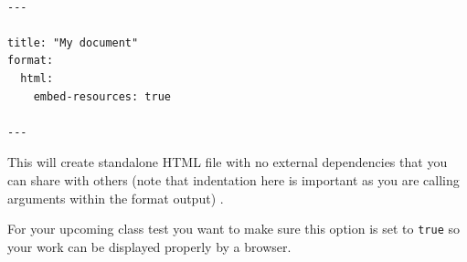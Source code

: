 \documentclass[
  letterpaper,
  DIV=11,
  numbers=noendperiod]{scrartcl}
\begin{document}
\begin{verbatim}

---

title: "My document"
format:
  html:
    embed-resources: true

---
\end{verbatim}

This will create standalone HTML file with no external dependencies that
you can share with others (note that indentation here is important as
you are calling arguments within the format output) .

\begin{tcolorbox}[enhanced jigsaw, colback=white, toprule=.15mm, arc=.35mm, colbacktitle=quarto-callout-important-color!10!white, titlerule=0mm, colframe=quarto-callout-important-color-frame, title=\textcolor{quarto-callout-important-color}{\faExclamation}\hspace{0.5em}{Important}, bottomtitle=1mm, toptitle=1mm, coltitle=black, rightrule=.15mm, opacityback=0, bottomrule=.15mm, breakable, leftrule=.75mm, left=2mm, opacitybacktitle=0.6]

For your upcoming class test you want to make sure this option is set to
\texttt{true} so your work can be displayed properly by a browser.

\end{tcolorbox}
\end{document}
